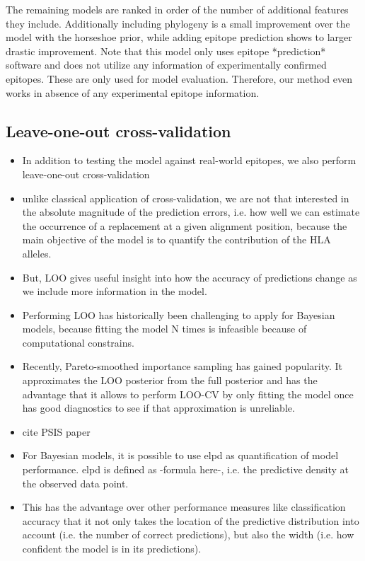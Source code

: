 \documentclass[fleqn,11pt]{SelfArx} %
\begin{document}
The remaining models are ranked in order of the number of additional features they include. Additionally including phylogeny is a small improvement over the model with the horseshoe prior, while adding epitope prediction shows to larger drastic improvement.
Note that this model only uses epitope *prediction* software and does not utilize any information of experimentally confirmed epitopes. These are only used for model evaluation. Therefore, our method even works in absence of any experimental epitope information.

\subsection{Leave-one-out cross-validation}

\begin{itemize}
  \item In addition to testing the model against real-world epitopes, we also perform leave-one-out cross-validation
  \item unlike classical application of cross-validation, we are not that interested in the absolute magnitude of the prediction errors, i.e. how well we can estimate the occurrence of a replacement at a given alignment position, because the main objective of the model is to quantify the contribution of the HLA alleles.
  \item But, LOO gives useful insight into how the accuracy of predictions change as we include more information in the model. 
  \item Performing LOO has historically been challenging to apply for Bayesian models, because fitting the model N times is infeasible because of computational constrains.
  \item Recently, Pareto-smoothed importance sampling has gained popularity. It approximates the LOO posterior from the full posterior and has the advantage that it allows to perform LOO-CV by only fitting the model once has good diagnostics to see if that approximation is unreliable.
  \item cite PSIS paper
  \item For Bayesian models, it is possible to use elpd as quantification of model performance. elpd is defined as -formula here-, i.e. the predictive density at the observed data point.
  \item This has the advantage over other performance measures like classification accuracy that it not only takes the location of the predictive distribution into account (i.e. the number of correct predictions), but also the width (i.e. how confident the model is in its predictions).

\end{itemize}
\end{document}
